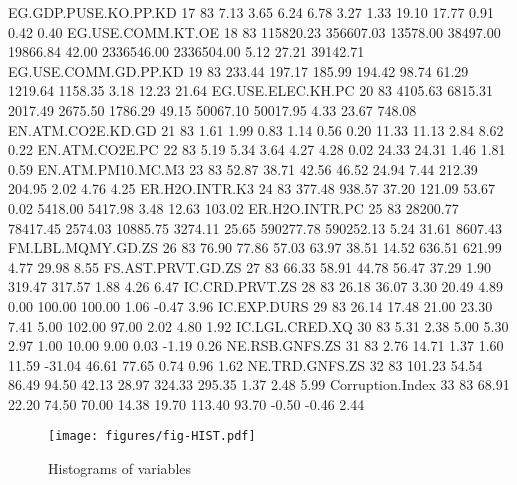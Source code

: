 \documentclass[a4paper]{article}
\begin{document}
\begin{Schunk}
\begin{Soutput}
EG.GDP.PUSE.KO.PP.KD  17 83       7.13       3.65      6.24      6.78      3.27   1.33       19.10       17.77  0.91     0.42      0.40
EG.USE.COMM.KT.OE     18 83  115820.23  356607.03  13578.00  38497.00  19866.84  42.00  2336546.00  2336504.00  5.12    27.21  39142.71
EG.USE.COMM.GD.PP.KD  19 83     233.44     197.17    185.99    194.42     98.74  61.29     1219.64     1158.35  3.18    12.23     21.64
EG.USE.ELEC.KH.PC     20 83    4105.63    6815.31   2017.49   2675.50   1786.29  49.15    50067.10    50017.95  4.33    23.67    748.08
EN.ATM.CO2E.KD.GD     21 83       1.61       1.99      0.83      1.14      0.56   0.20       11.33       11.13  2.84     8.62      0.22
EN.ATM.CO2E.PC        22 83       5.19       5.34      3.64      4.27      4.28   0.02       24.33       24.31  1.46     1.81      0.59
EN.ATM.PM10.MC.M3     23 83      52.87      38.71     42.56     46.52     24.94   7.44      212.39      204.95  2.02     4.76      4.25
ER.H2O.INTR.K3        24 83     377.48     938.57     37.20    121.09     53.67   0.02     5418.00     5417.98  3.48    12.63    103.02
ER.H2O.INTR.PC        25 83   28200.77   78417.45   2574.03  10885.75   3274.11  25.65   590277.78   590252.13  5.24    31.61   8607.43
FM.LBL.MQMY.GD.ZS     26 83      76.90      77.86     57.03     63.97     38.51  14.52      636.51      621.99  4.77    29.98      8.55
FS.AST.PRVT.GD.ZS     27 83      66.33      58.91     44.78     56.47     37.29   1.90      319.47      317.57  1.88     4.26      6.47
IC.CRD.PRVT.ZS        28 83      26.18      36.07      3.30     20.49      4.89   0.00      100.00      100.00  1.06    -0.47      3.96
IC.EXP.DURS           29 83      26.14      17.48     21.00     23.30      7.41   5.00      102.00       97.00  2.02     4.80      1.92
IC.LGL.CRED.XQ        30 83       5.31       2.38      5.00      5.30      2.97   1.00       10.00        9.00  0.03    -1.19      0.26
NE.RSB.GNFS.ZS        31 83       2.76      14.71      1.37      1.60     11.59 -31.04       46.61       77.65  0.74     0.96      1.62
NE.TRD.GNFS.ZS        32 83     101.23      54.54     86.49     94.50     42.13  28.97      324.33      295.35  1.37     2.48      5.99
Corruption.Index      33 83      68.91      22.20     74.50     70.00     14.38  19.70      113.40       93.70 -0.50    -0.46      2.44
\end{Soutput}
\end{Schunk}
\endgroup


\begin{figure}[H]
\begin{center}
\advance\rightskip-0.5cm
\advance\leftskip-1cm
\texttt{[image: figures/fig-HIST.pdf]}
\caption{Histograms of variables}
\end{center}
\end{figure}
\end{document}
